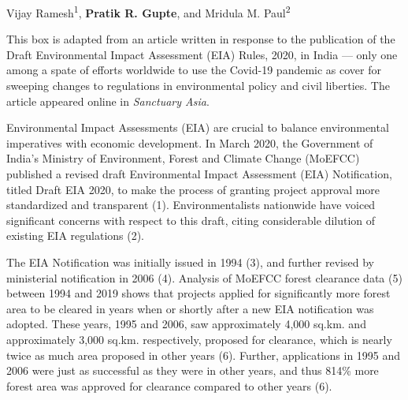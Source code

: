 
\begin{refsection}
\newrefcontext[sorting=ynt]
\pagestyle{plain}
\pagecolor{Snow1}

	\label{box:clearances}

	\noindent Vijay Ramesh\textsuperscript{1}, \textbf{Pratik R. Gupte}, and Mridula M. Paul\textsuperscript{2}


	\medskip
	\footnotesize

	\noindent {{$\Delta$}} {\footnotesize This box is adapted from an article written in response to the publication of the Draft Environmental Impact Assessment (EIA) Rules, 2020, in India --- only one among a spate of efforts worldwide to use the Covid-19 pandemic as cover for sweeping changes to regulations in environmental policy and civil liberties.
	The article appeared online in \textit{Sanctuary Asia}.}

	\medskip

	Environmental Impact Assessments (EIA) are crucial to balance environmental imperatives with economic development.  
	In March 2020, the Government of India's Ministry of Environment, Forest and Climate Change (MoEFCC) published a revised draft Environmental Impact Assessment (EIA) Notification, titled Draft EIA 2020, to make the process of granting project approval more standardized and transparent (1). 
	Environmentalists nationwide have voiced significant concerns with respect to this draft, citing considerable dilution of existing EIA regulations (2). 

	The EIA Notification was initially issued in 1994 (3), and further revised by ministerial notification in 2006 (4). 
	Analysis of MoEFCC forest clearance data (5) between 1994 and 2019 shows that projects applied for significantly more forest area to be cleared in years when or shortly after a new EIA notification was adopted. 
	These years, 1995 and 2006, saw approximately 4,000 sq.km. and approximately 3,000 sq.km. respectively, proposed for clearance, which is nearly twice as much area proposed in other years (6). 
	Further, applications in 1995 and 2006 were just as successful as they were in other years, and thus 814\% more forest area was approved for clearance compared to other years (6).


\end{refsection}
